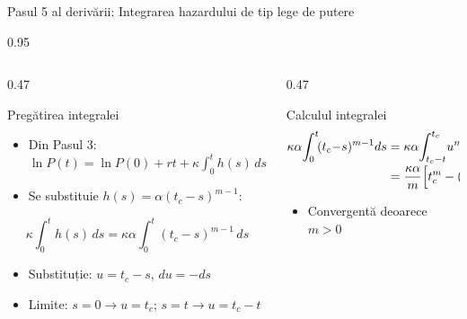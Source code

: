 \documentclass[9pt, aspectratio=169, t]{beamer}
\begin{document}
\begin{frame}{Pasul 5 al derivării: Integrarea hazardului de tip lege de putere}
    \begin{cminipage}{0.95\textwidth}
    {\footnotesize
    \begin{columns}[T]
        \begin{column}{0.47\textwidth}
            \begin{block}{Pregătirea integralei}
                \begin{itemize}\setlength{\itemsep}{0pt}
                    \item Din Pasul 3: $\ln P(t) = \ln P(0) + rt + \kappa\!\int_0^t\! h(s)\,ds$
                    \item Se substituie $h(s) = \alpha(t_c - s)^{m-1}$:
                \end{itemize}
                \vspace{-2mm}
                $$\kappa\!\int_0^t\! h(s)\,ds = \kappa\alpha\!\int_0^t\! (t_c - s)^{m-1}\,ds$$
                \vspace{-4mm}
                \begin{itemize}\setlength{\itemsep}{0pt}
                    \item Substituție: $u = t_c - s$, $du = -ds$
                    \item Limite: $s{=}0 \!\to\! u{=}t_c$;\; $s{=}t \!\to\! u{=}t_c{-}t$
                \end{itemize}
            \end{block}
        \end{column}
        \begin{column}{0.47\textwidth}
            \begin{alertblock}{Calculul integralei}
                \vspace{-2mm}
                \begin{align*}
                    \kappa\alpha\!\int_0^t\! (t_c{-}s)^{m-1}ds &= \kappa\alpha\!\int_{t_c-t}^{t_c}\! u^{m-1}\,du \\[-2pt]
                    &= \frac{\kappa\alpha}{m}\Bigl[t_c^m - (t_c{-}t)^m\Bigr]
                \end{align*}
                \vspace{-4mm}
                \begin{itemize}\setlength{\itemsep}{0pt}
                    \item Convergentă deoarece $m > 0$
                \end{itemize}
            \end{alertblock}

\end{column}
\end{columns}}
\end{cminipage}
\end{frame}
\end{document}
